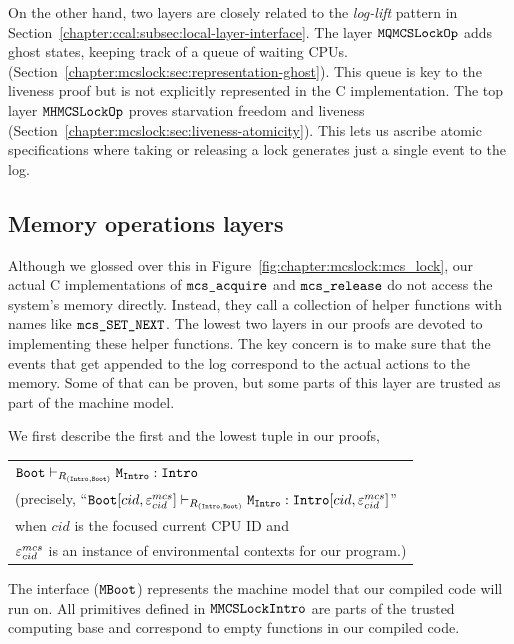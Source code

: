 On the other hand, two layers are closely related to the  \textit{log-lift} pattern in Section~\ref{chapter:ccal:subsec:local-layer-interface}.
The layer ${\mathrm{\texttt{MQMCSLockOp}}}$ adds ghost states, keeping track of a
queue of waiting CPUs.
(Section~\ref{chapter:mcslock:sec:representation-ghost}). This queue is key to the liveness proof but is not explicitly represented in the C implementation.
The top layer ${\mathrm{\texttt{MHMCSLockOp}}}$ proves starvation freedom and liveness
(Section~\ref{chapter:mcslock:sec:liveness-atomicity}). This lets us ascribe atomic
specifications where taking or releasing a lock generates just a
single event to the log.

\subsection{Memory operations layers}
\label{chapter:mcslock:subsec:lowestmachinemodel}


Although we glossed over this in Figure~\ref{fig:chapter:mcslock:mcs_lock}, our
actual C implementations of ${\mathrm{\texttt{mcs\_acquire}}}$ and
${\mathrm{\texttt{mcs\_release}}}$ do not access the system's memory directly.  Instead, they call
a collection of helper functions with names like
${\mathrm{\texttt{mcs\_SET\_NEXT}}}$. The lowest two layers in our proofs
are devoted to implementing these helper functions.
The key concern is to make sure that the events that get appended to the log correspond to the actual actions to the memory. Some of that can be proven, 
but some parts of this layer are trusted as part of the machine model.

We first describe the first and the lowest tuple in our proofs,

\begin{center}
\begin{tabular}{P{0.95\textwidth}}
${\mathrm{\texttt{Boot}}} \vdash_{R_{({\mathrm{\texttt{Intro}}}, {\mathrm{\texttt{Boot}}})}} {\mathrm{\texttt{M}}}_{{\mathrm{\texttt{Intro}}}} : {\mathrm{\texttt{Intro}}}$\\
(precisely, ``${\mathrm{\texttt{Boot}}}[cid, {\varepsilon}^{mcs}_{cid}] \vdash_{R_{({\mathrm{\texttt{Intro}}}, {\mathrm{\texttt{Boot}}})}} {\mathrm{\texttt{M}}}_{{\mathrm{\texttt{Intro}}}} : {\mathrm{\texttt{Intro}}}[cid, {\varepsilon}^{mcs}_{cid}]$'' \\
when $cid$ is the focused current CPU ID and\\
 ${\varepsilon}^{mcs}_{cid}$ is an instance of environmental contexts for our program.)\\
\end{tabular}
\end{center}

The interface (${\mathrm{\texttt{MBoot}}}$) represents the machine model that our compiled code will run on.
All primitives defined in ${\mathrm{\texttt{MMCSLockIntro}}}$ are parts of the trusted computing base and correspond to empty functions in our compiled code.

